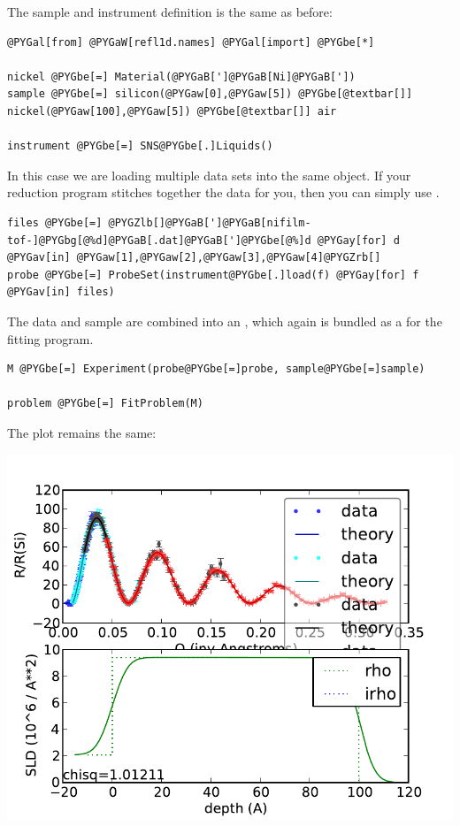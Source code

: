 \documentclass[letterpaper,10pt,english]{sphinxmanual}
\begin{document}
The sample and instrument definition is the same as before:

\begin{Verbatim}[commandchars=@\[\]]
@PYGal[from] @PYGaW[refl1d.names] @PYGal[import] @PYGbe[*]

nickel @PYGbe[=] Material(@PYGaB[']@PYGaB[Ni]@PYGaB['])
sample @PYGbe[=] silicon(@PYGaw[0],@PYGaw[5]) @PYGbe[@textbar[]] nickel(@PYGaw[100],@PYGaw[5]) @PYGbe[@textbar[]] air

instrument @PYGbe[=] SNS@PYGbe[.]Liquids()
\end{Verbatim}

In this case we are loading multiple data sets into the same
{\hyperref[api/probe:refl1d.probe.ProbeSet]{}} object.  If your
reduction program stitches together the data for you, then you can simply
use .

\begin{Verbatim}[commandchars=@\[\]]
files @PYGbe[=] @PYGZlb[]@PYGaB[']@PYGaB[nifilm-tof-]@PYGbg[@%d]@PYGaB[.dat]@PYGaB[']@PYGbe[@%]d @PYGay[for] d @PYGav[in] @PYGaw[1],@PYGaw[2],@PYGaw[3],@PYGaw[4]@PYGZrb[]
probe @PYGbe[=] ProbeSet(instrument@PYGbe[.]load(f) @PYGay[for] f @PYGav[in] files)
\end{Verbatim}

The data and sample are combined into an
{\hyperref[api/experiment:refl1d.experiment.Experiment]{}},
which again is bundled as a
for the fitting program.

\begin{Verbatim}[commandchars=@\[\]]
M @PYGbe[=] Experiment(probe@PYGbe[=]probe, sample@PYGbe[=]sample)

problem @PYGbe[=] FitProblem(M)
\end{Verbatim}

The plot remains the same:

\includegraphics{564caae046.pdf}
\end{document}
